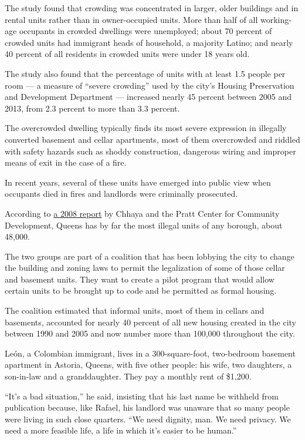 The study found that crowding was concentrated in larger, older
buildings and in rental units rather than in owner-occupied units. More
than half of all working-age occupants in crowded dwellings were
unemployed; about 70 percent of crowded units had immigrant heads of
household, a majority Latino; and nearly 40 percent of all residents in
crowded units were under 18 years old.

The study also found that the percentage of units with at least 1.5
people per room --- a measure of ``severe crowding'' used by the city's
Housing Preservation and Development Department --- increased nearly 45
percent between 2005 and 2013, from 2.3 percent to more than 3.3
percent.

The overcrowded dwelling typically finds its most severe expression in
illegally converted basement and cellar apartments, most of them
overcrowded and riddled with safety hazards such as shoddy construction,
dangerous wiring and improper means of exit in the case of a fire.

In recent years, several of these units have emerged into public view
when occupants died in fires and landlords were criminally prosecuted.

According to
\href{http://prattcenter.net/sites/default/files/housing_underground_0.pdf}{a
2008 report} by Chhaya and the Pratt Center for Community Development,
Queens has by far the most illegal units of any borough, about 48,000.

The two groups are part of a coalition that has been lobbying the city
to change the building and zoning laws to permit the legalization of
some of those cellar and basement units. They want to create a pilot
program that would allow certain units to be brought up to code and be
permitted as formal housing.

The coalition estimated that informal units, most of them in cellars and
basements, accounted for nearly 40 percent of all new housing created in
the city between 1990 and 2005 and now number more than 100,000
throughout the city.

León, a Colombian immigrant, lives in a 300-square-foot, two-bedroom
basement apartment in Astoria, Queens, with five other people: his wife,
two daughters, a son-in-law and a granddaughter. They pay a monthly rent
of \$1,200.

``It's a bad situation,'' he said, insisting that his last name be
withheld from publication because, like Rafael, his landlord was unaware
that so many people were living in such close quarters. ``We need
dignity, man. We need privacy. We need a more feasible life, a life in
which it's easier to be human.''

